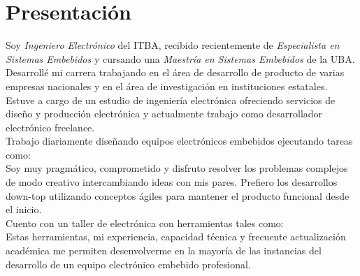 \section{Presentación}
Soy \emph{Ingeniero Electrónico} del ITBA, recibido recientemente de \emph{Especialista
en Sistemas Embebidos} y cursando una \emph{Maestría en Sistemas Embebidos} de la UBA. \\
Desarrollé mi carrera trabajando en el área de desarrollo de producto de varias
empresas nacionales y en el área de investigación en instituciones estatales.\\
Estuve a cargo de un estudio de ingeniería electrónica ofreciendo servicios de
diseño y producción electrónica y actualmente trabajo como desarrollador
electrónico freelance.\\ %
Trabajo diariamente diseñando equipos electrónicos embebidos ejecutando tareas como: \\
Soy muy pragmático, comprometido y disfruto resolver los problemas complejos de
modo creativo intercambiando ideas con mis pares. Prefiero los desarrollos
down-top utilizando conceptos ágiles para mantener el producto funcional desde
el inicio.\\
Cuento con un taller de electrónica con herramientas tales como: \\
Estas herramientas, mi experiencia, capacidad técnica y frecuente actualización académica me
permiten desenvolverme en la mayoría de las instancias del desarrollo de un
equipo electrónico embebido profesional.\\
\href{https://github.com/pslavkin}{\faGithub}
\href{https://www.linkedin.com/in/pablo-slavkin/}{\faLinkedin}

